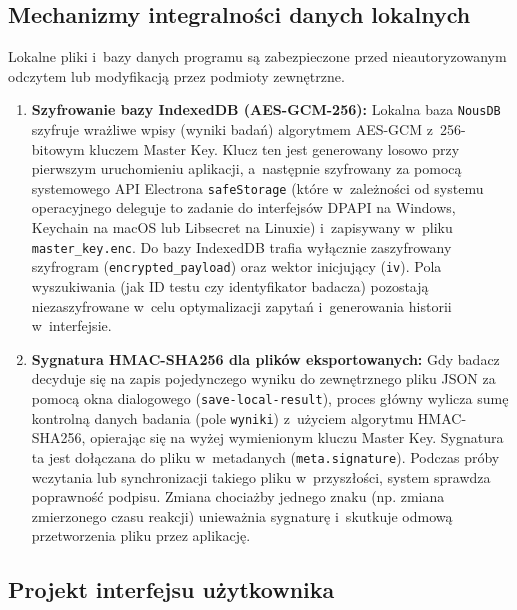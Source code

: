 \documentclass[12pt, a4paper, oneside]{report}
\begin{document}
\subsection{Mechanizmy integralności danych lokalnych}
\label{subsec:integralnosc}

Lokalne pliki i~bazy danych programu są zabezpieczone przed nieautoryzowanym odczytem lub modyfikacją przez podmioty zewnętrzne.
\begin{enumerate}
	\item \textbf{Szyfrowanie bazy IndexedDB (AES-GCM-256):}
	      Lokalna baza \texttt{NousDB} szyfruje wrażliwe wpisy (wyniki badań) algorytmem AES-GCM z~256-bitowym kluczem Master Key. Klucz ten jest generowany losowo przy pierwszym uruchomieniu aplikacji, a~następnie szyfrowany za pomocą systemowego API Electrona \texttt{safeStorage} (które w~zależności od systemu operacyjnego deleguje to zadanie do interfejsów DPAPI na Windows, Keychain na macOS lub Libsecret na Linuxie) i~zapisywany w~pliku \texttt{master\_key.enc}. Do bazy IndexedDB trafia wyłącznie zaszyfrowany szyfrogram (\texttt{encrypted\_payload}) oraz wektor inicjujący (\texttt{iv}). Pola wyszukiwania (jak ID testu czy identyfikator badacza) pozostają niezaszyfrowane w~celu optymalizacji zapytań i~generowania historii w~interfejsie.
	\item \textbf{Sygnatura HMAC-SHA256 dla plików eksportowanych:}
	      Gdy badacz decyduje się na zapis pojedynczego wyniku do zewnętrznego pliku JSON za pomocą okna dialogowego (\texttt{save-local-result}), proces główny wylicza sumę kontrolną danych badania (pole \texttt{wyniki}) z~użyciem algorytmu HMAC-SHA256, opierając się na wyżej wymienionym kluczu Master Key. Sygnatura ta jest dołączana do pliku w~metadanych (\texttt{meta.signature}). Podczas próby wczytania lub synchronizacji takiego pliku w~przyszłości, system sprawdza poprawność podpisu. Zmiana chociażby jednego znaku (np. zmiana zmierzonego czasu reakcji) unieważnia sygnaturę i~skutkuje odmową przetworzenia pliku przez aplikację.
\end{enumerate}

\subsection{Projekt interfejsu użytkownika}
\label{subsec:ui}
\end{document}

